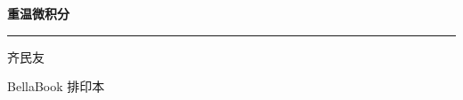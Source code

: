 \documentclass[UTF8,openany,11pt]{ctexbook}
\begin{document}
\begin{titlepage}
\thispagestyle{empty}
\centering
\vspace*{38mm}
{\sffamily\bfseries\color{BellaBlue}\fontsize{30}{38}\selectfont 重温微积分\par}
\vspace{10mm}
{\color{BellaBlue}\rule{42mm}{0.8pt}\par}
\vspace{14mm}
{\fontsize{17}{22}\selectfont 齐民友\par}
\vfill
{\small\sffamily\color{BellaGray}BellaBook 排印本\par}
\vspace{9mm}
\end{titlepage}

\frontmatter

\mainmatter






































\end{document}
